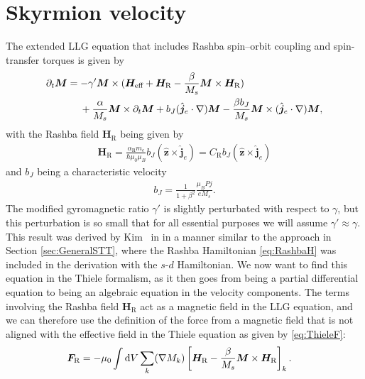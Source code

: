 \section{Skyrmion velocity}
The extended LLG equation that includes Rashba spin--orbit coupling and spin-transfer torques is given by
\begin{align}
\nonumber \partial_t \mathbold{M} &= -\gamma'\mathbold{M}\times(\mathbold{H}_{\text{eff}}+\mathbold{H}_{\text{R}}-\frac{\beta}{M_s} \mathbold{M}\times\mathbold{H}_{\text{R}}) \\
&\hspace{4.5mm}+\frac{\alpha}{M_s}\mathbold{M}\times\partial_t \mathbold{M} + b_J (\mathbold{\hat{j}}_e\cdot\mathbold{\nabla})\mathbold{M} - \frac{\beta b_J}{M_s} \mathbold{M}\times(\mathbold{\hat{j}}_e\cdot\mathbold{\nabla})\mathbold{M}, 
\label{eq:LLG_EC}
\end{align}
with the Rashba field $\mathbold{H}_{\text{R}}$ being given by
\begin{align}
\mathbold{H}_{\text{R}} = \frac{\alpha_{\text{R}} m_e}{\hbar \mu_0\mu_B}b_J (\mathbold{\hat{z}}\times\mathbold{\hat{j}}_e) = C_{\text{R}} b_J (\mathbold{\hat{z}}\times\mathbold{\hat{j}}_e)
\end{align}
and $b_J$ being a characteristic velocity
\begin{align}
    b_J = \frac{1}{1+\beta^2}\frac{\mu_B P j}{e M_s}.
\end{align}
The modified gyromagnetic ratio $\gamma'$ is slightly perturbated with respect to $\gamma$, but this perturbation is so small that for all essential purposes we will assume $\gamma'\approx\gamma$.
This result was derived by Kim \etal~in \cite{Kim2012} in a manner similar to the approach in Section \ref{sec:GeneralSTT}, where the Rashba Hamiltonian \eqref{eq:RashbaH} was included in the derivation with the $s$-$d$ Hamiltonian. We now want to find this equation in the Thiele formalism, as it then goes from being a partial differential equation to being an algebraic equation in the velocity components. The terms involving the Rashba field $\mathbold{H}_{\text{R}}$ act as a magnetic field in the LLG equation, and we can therefore use the definition of the force from a magnetic field that is not aligned with the effective field in the Thiele equation as given by \eqref{eq:ThieleF}:
\begin{align}
\mathbold{F}_{\text{R}} &= -\mu_0\int \d V\sum_k (\mathbold{\nabla}M_k)\left[\mathbold{H}_{\text{R}} - \frac{\beta}{M_s}\mathbold{M}\times\mathbold{H}_{\text{R}}\right]_k.
\end{align}
